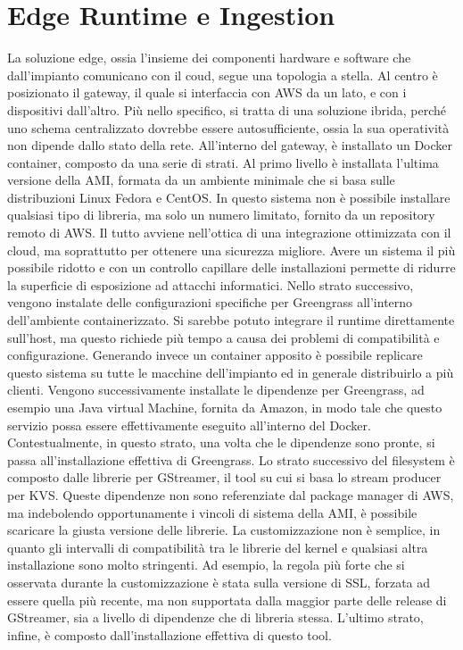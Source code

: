 \section{Edge Runtime e Ingestion}

La soluzione edge, ossia l'insieme dei componenti hardware e software che dall'impianto comunicano con il coud, segue una topologia a stella. Al centro è posizionato il gateway, il quale si interfaccia con AWS da un lato, e con i dispositivi dall'altro. Più nello specifico, si tratta di una soluzione ibrida, perché uno schema centralizzato dovrebbe essere autosufficiente, ossia la sua operatività non dipende dallo stato della rete. All'interno del gateway, è installato un Docker container, composto da una serie di strati. Al primo livello è installata l'ultima versione della AMI, formata da un ambiente minimale che si basa sulle distribuzioni Linux Fedora e CentOS. In questo sistema non è possibile installare qualsiasi tipo di libreria, ma solo un numero limitato, fornito da un repository remoto di AWS. Il tutto avviene nell'ottica di una integrazione ottimizzata con il cloud, ma soprattutto per ottenere una sicurezza migliore. Avere un sistema il più possibile ridotto e con un controllo capillare delle installazioni permette di ridurre la superficie di esposizione ad attacchi informatici. Nello strato successivo, vengono instalate delle configurazioni specifiche per Greengrass all'interno dell'ambiente containerizzato. Si sarebbe potuto integrare il runtime direttamente sull'host, ma questo richiede più tempo a causa dei problemi di compatibilità e configurazione. Generando invece un container apposito è possibile replicare questo sistema su tutte le macchine dell'impianto ed in generale distribuirlo a più clienti. Vengono successivamente installate le dipendenze per Greengrass, ad esempio una Java virtual Machine, fornita da Amazon, in modo tale che questo servizio possa essere effettivamente eseguito all'interno del Docker. Contestualmente, in questo strato, una volta che le dipendenze sono pronte, si passa all'installazione effettiva di Greengrass. Lo strato successivo del filesystem è composto dalle librerie per GStreamer, il tool su cui si basa lo stream producer per KVS. Queste dipendenze non sono referenziate dal package manager di AWS, ma indebolendo opportunamente i vincoli di sistema della AMI, è possibile scaricare la giusta versione delle librerie. La customizzazione non è semplice, in quanto gli intervalli di compatibilità tra le librerie del kernel e qualsiasi altra installazione sono molto stringenti. Ad esempio, la regola più forte che si osservata durante la customizzazione è stata sulla versione di SSL, forzata ad essere quella più recente, ma non supportata dalla maggior parte delle release di GStreamer, sia a livello di dipendenze che di libreria stessa. L'ultimo strato, infine, è composto dall'installazione effettiva di questo tool.







